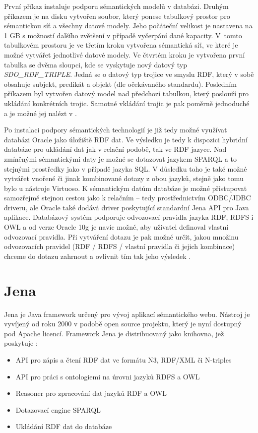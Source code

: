 \documentclass{projekt}
\begin{document}
První příkaz instaluje podporu sémantických modelů v databázi. Druhým příkazem je na disku vytvořen soubor, který ponese tabulkový prostor pro sémantickou síť a všechny datové modely. Jeho počáteční velikost je nastavena na 1 GB s možností dalšího zvětšení v případě vyčerpání dané kapacity. V~tomto tabulkovém prostoru je ve třetím kroku vytvořena sémantická síť, ve které je možné vytvářet jednotlivé datové modely. Ve čtvrtém kroku je vytvořena první tabulka se dvěma sloupci, kde se vyskytuje nový datový typ {\it SDO\_RDF\_TRIPLE}. Jedná se o datový typ trojice ve smyslu RDF, který v sobě obsahuje subjekt, predikát a objekt (dle očekávaného standardu). Posledním příkazem byl vytvořen datový model nad předchozí tabulkou, který poslouží pro ukládání konkrétních trojic. Samotné vkládání trojic je pak poměrně jednoduché a je možné jej nalézt v \cite{_26}.

Po instalaci podpory sémantických technologií je již tedy možné využívat databázi Oracle jako úložiště RDF dat. Ve výsledku je tedy k dispozici hybridní databáze pro ukládání dat jak v relační podobě, tak ve RDF jazyce. Nad zmíněnými sémantickými daty je možné se dotazovat jazykem SPARQL a to stejnými prostředky jako v případě jazyka SQL. V důsledku toho je také možné vytvářet vnořené či jinak kombinované dotazy z obou jazyků, stejně jako tomu bylo u nástroje Virtuoso. K sémantickým datům databáze je možné přistupovat samozřejmě stejnou cestou jako k relačním – tedy prostřednictvím ODBC/JDBC driveru, ale Oracle také dodává driver poskytující standardní Jena API pro Java aplikace. 
Databázový systém podporuje odvozovací pravidla jazyka RDF, RDFS i OWL a od verze Oracle 10g je navíc možné, aby uživatel definoval vlastní odvozovací pravidla. Při vytváření dotazu je pak možné určit, jakou množinu odvozovacích pravidel (RDF / RDFS / vlastní pravidla či jejich kombinace) chceme do dotazu zahrnout a ovlivnit tím tak jeho výsledek \cite{_26}.


\section{Jena}
\hspace{0.65cm} Jena je Java framework určený pro vývoj aplikací sémantického webu. Nástroj je vyvíjený od roku 2000 v podobě open source projektu, který je nyní dostupný pod Apache licencí. Framework Jena je distribuovaný jako knihovna, jež poskytuje \cite{_28}:

\begin{itemize}
\item API pro zápis a čtení RDF dat ve formátu N3, RDF/XML či N-triples
\item API pro práci s ontologiemi na úrovni jazyků RDFS a OWL
\item Reasoner pro zpracování dat jazyků RDF a OWL
\item Dotazovací engine SPARQL
\item Ukládání RDF dat do databáze
\end{itemize}
\end{document}
